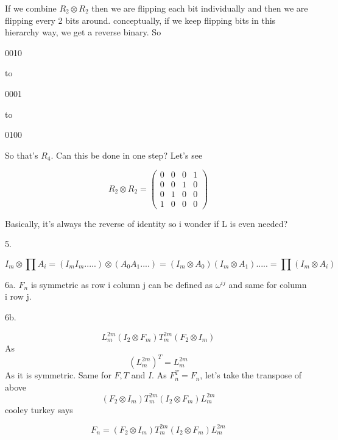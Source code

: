 \documentclass{article}
\begin{document}
	If we combine $R_2 \otimes R_2$ then we are flipping each bit individually and then we are flipping every 2 bits around. conceptually, if we keep flipping bits in this hierarchy way, we get a reverse binary. So
	
	0010
	
	to
	
	0001
	
	to
	
	0100
	
	So that's $R_4$. Can this be done in one step? Let's see
	
	\begin{equation}
		R_2 \otimes R_2 =\begin{pmatrix}
			0 & 0 & 0 & 1\\
			0 & 0 & 1 & 0 \\
			0 & 1 & 0 & 0 \\
			1 & 0 & 0 & 0
		\end{pmatrix}
	\end{equation}

	Basically, it's always the reverse of identity so i wonder if L is even needed?
	
	5.
	
	\begin{equation}
		I_m \otimes \prod A_i = (I_mI_m.....) \otimes (A_0A_1....) = (I_m \otimes A_0)(I_m \otimes A_1)..... = \prod (I_m \otimes A_i)
	\end{equation}

	6a. $F_n$ is symmetric as row i column j can be defined as
	$\omega^{ij}$ and same for column i row j.
	
	6b. 
	
	\begin{equation}
		L^{2m}_m(I_2 \otimes F_m)T_m^{2m}(F_2 \otimes I_m)
	\end{equation}
	As
	\begin{equation}
		(L^{2m}_m)^T = L^{2m}_m
	\end{equation}
	As it is symmetric. Same for $F, T$ and $I$. As $F_n^T = F_n$, let's take the transpose of above
	\begin{equation}
		(F_2 \otimes I_m)T_m^{2m}(I_2 \otimes F_m)L^{2m}_m
	\end{equation}
	cooley turkey says
	
	\begin{equation}
		F_n=(F_2 \otimes I_m)T_m^{2m}(I_2 \otimes F_m)L_m^{2m}
	\end{equation}
	
	
\end{document}
